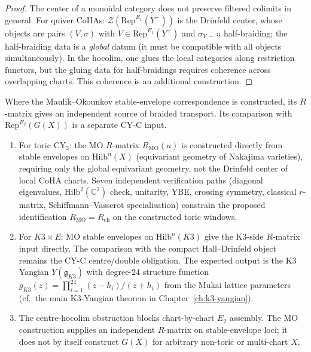 \begin{proof}
The center of a monoidal category does not preserve filtered colimits in
general. For quiver CoHAs: $\mathcal{Z}(\mathrm{Rep}^{E_1}(Y^+))$ is
the Drinfeld center, whose objects are pairs $(V, \sigma)$ with $V\in
\mathrm{Rep}^{E_1}(Y^+)$ and $\sigma_{V,-}$ a half-braiding; the
half-braiding data is a \emph{global} datum (it must be compatible with
all objects simultaneously). In the hocolim, one glues the local
categories along restriction functors, but the gluing data for
half-braidings requires coherence across overlapping charts. This
coherence is an additional construction.
\end{proof}

\begin{proposition}
\label{prop:thy-6dhcs-mo-bypass}
Where the Maulik--Okounkov stable-envelope correspondence is
constructed, its \(R\)-matrix gives an independent source of braided
transport. Its comparison with \(\mathrm{Rep}^{E_2}(G(X))\) is a
separate CY-C input.
\begin{enumerate}[label=\emph{(\roman*)}]
 \item For toric $\mathrm{CY}_3$: the MO $R$-matrix $R_{\mathrm{MO}}(u)$
 is constructed directly from stable envelopes on
 $\mathrm{Hilb}^n(X)$ (equivariant geometry of Nakajima varieties),
 requiring only the global equivariant geometry, not the Drinfeld
 center of local CoHA charts. Seven independent verification paths
 (diagonal eigenvalues, $\mathrm{Hilb}^2(\mathbb{C}^2)$ check,
 unitarity, YBE, crossing symmetry, classical $r$-matrix,
 Schiffmann--Vasserot specialisation) constrain the proposed identification
 \(R_{\mathrm{MO}} = R_{\mathrm{ch}}\) on the constructed toric
 windows.
 \item For $K3\times E$: MO stable envelopes on $\mathrm{Hilb}^n(K3)$
 give the K3-side \(R\)-matrix input directly. The comparison with the
 compact Hall--Drinfeld object remains the CY-C centre/double
 obligation. The expected output is the K3 Yangian
 \(Y(\mathfrak{g}_{K3})\) with
 degree-$24$ structure function
 $g_{K3}(z) = \prod_{i=1}^{24}(z-h_i)/(z+h_i)$ from the Mukai
 lattice parameters (cf.\
 the main K3-Yangian theorem in
 Chapter~\ref{ch:k3-yangian}).
 \item The centre-hocolim obstruction blocks chart-by-chart
 \(E_2\) assembly. The MO construction supplies an independent
 \(R\)-matrix on stable-envelope loci; it does not by itself construct
 \(G(X)\) for arbitrary non-toric or multi-chart \(X\).
\end{enumerate}
\end{proposition}
